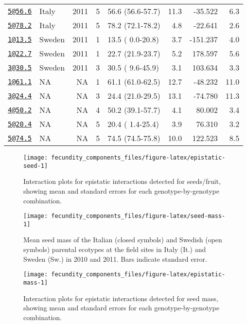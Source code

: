 \documentclass[]{article}
\begin{document}
\begin{longtable}[]{@{}llrrlrrr@{}}
\href{mailto:5@56.6}{\nolinkurl{5@56.6}} & Italy & 2011 & 5 & 56.6 (56.6-57.7) & 11.3 & -35.522 & 6.3\tabularnewline
\href{mailto:5@78.2}{\nolinkurl{5@78.2}} & Italy & 2011 & 5 & 78.2 (72.1-78.2) & 4.8 & -22.641 & 2.6\tabularnewline
\href{mailto:1@13.5}{\nolinkurl{1@13.5}} & Sweden & 2011 & 1 & 13.5 ( 0.0-20.8) & 3.7 & -151.237 & 4.0\tabularnewline
\href{mailto:1@22.7}{\nolinkurl{1@22.7}} & Sweden & 2011 & 1 & 22.7 (21.9-23.7) & 5.2 & 178.597 & 5.6\tabularnewline
\href{mailto:3@30.5}{\nolinkurl{3@30.5}} & Sweden & 2011 & 3 & 30.5 ( 9.6-45.9) & 3.1 & 103.634 & 3.3\tabularnewline
\href{mailto:1@61.1}{\nolinkurl{1@61.1}} & NA & NA & 1 & 61.1 (61.0-62.5) & 12.7 & -48.232 & 11.0\tabularnewline
\href{mailto:3@24.4}{\nolinkurl{3@24.4}} & NA & NA & 3 & 24.4 (21.0-29.5) & 13.1 & -74.780 & 11.3\tabularnewline
\href{mailto:4@50.2}{\nolinkurl{4@50.2}} & NA & NA & 4 & 50.2 (39.1-57.7) & 4.1 & 80.002 & 3.4\tabularnewline
\href{mailto:5@20.4}{\nolinkurl{5@20.4}} & NA & NA & 5 & 20.4 ( 1.4-25.4) & 3.9 & 76.310 & 3.2\tabularnewline
\href{mailto:5@74.5}{\nolinkurl{5@74.5}} & NA & NA & 5 & 74.5 (74.5-75.8) & 10.0 & 122.523 & 8.5\tabularnewline
\bottomrule
\end{longtable}

\newpage

\begin{figure}

{\centering \texttt{[image: fecundity\_components\_files/figure-latex/epistatic-seed-1]} 

}

\caption[Epistatic interactions for seeds/fruit]{Interaction plots for epistatic interactions detected for seeds/fruit, showing mean and standard errors for each genotype-by-genotype combination.}\label{fig:epistatic-seed}
\end{figure}

\newpage

\begin{figure}

{\centering \texttt{[image: fecundity\_components\_files/figure-latex/seed-mass-1]} 

}

\caption[Seed mass among parental lines]{Mean seed mass of the Italian (closed symbols) and Swedish (open symbols) parental ecotypes at the field sites in Italy (It.) and Sweden (Sw.) in 2010 and 2011. Bars indicate standard error.}\label{fig:seed-mass}
\end{figure}

\newpage

\begin{figure}

{\centering \texttt{[image: fecundity\_components\_files/figure-latex/epistatic-mass-1]} 

}

\caption[Epistatic interactions for seed mass]{Interaction plots for epistatic interactions detected for seed mass, showing mean and standard errors for each genotype-by-genotype combination.}\label{fig:epistatic-mass}
\end{figure}
\end{document}
